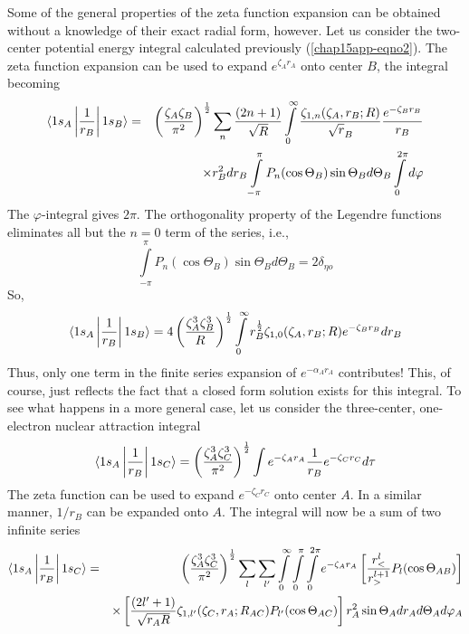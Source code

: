 Some of the general properties of the zeta function expansion can be
obtained without a knowledge of their exact radial form, however. Let
us consider the two-center potential energy integral calculated
previously (\ref{chap15app-eqno2}).  The zeta function expansion can
be used to expand $e^{\zeta_Ar_A}$ onto center $B$, the integral
becoming
\begin{eqnarray}
\langle 1s_A \left| {1 \over r_B} \right| 1s_B \rangle & = & \left( 
{\zeta_A \zeta_B \over \pi^2} \right)^{{1 \over 2}} \sum_{n} {(2n+1) 
\over \sqrt{R}} \int\limits^{\infty}_{0} {\zeta_{1,n}(\zeta_A,r_B;R) 
\over \sqrt{r}_B} {e^{-\zeta_Br_B} \over r_B}\cr
&& \times r^2_B dr_B \int\limits^{\pi}_{- \pi} P_n ( \cos \Theta_B ) 
\sin \Theta_B d \Theta_B \int\limits^{2\pi}_{0} d \varphi
\end{eqnarray}
The $\varphi$-integral gives $2\pi$.  The orthogonality property of 
the Legendre functions eliminates all but the $n = 0$ term of the series, i.e.,
\begin{equation}
\int\limits^{\pi}_{-\pi} P_n ( \cos \Theta_B ) \sin \Theta_B d 
\Theta_B = 2 \delta_{\eta o}
\end{equation}
So,
\begin{equation}
\langle 1s_A \left| {1 \over r_B} \right| 1s_B \rangle = 4 
\left( {\zeta^3_A \zeta^3_B \over R} \right)^{{1 \over 2}} 
\int\limits^{\infty}_{0} r^{{1 \over 2}}_B \zeta_{1,0} (\zeta_A, 
r_B;R) e^{-\zeta_B r_B} dr_B
\end{equation}
Thus, only one term in the finite series expansion of 
$e^{-\alpha_Ar_A}$ contributes!  This, of course, just reflects the 
fact that a closed form solution exists for
this integral.  To see what happens in a more general case, let us consider
the three-center, one-electron nuclear attraction integral
\begin{equation}
\langle 1s_A \left| {1 \over r_B} \right| 1s_C \rangle = 
\left( {\zeta^3_A \zeta^3_C \over \pi^2} \right)^{{1 \over 2}} 
\int e^{- \zeta_Ar_A} {1 \over r_B} e^{- \zeta_Cr_C} d \tau
\end{equation}
The zeta function can be used to expand $e^{-\zeta_Cr_C}$ onto 
center $A$. In a similar manner, $1/r_B$ can be expanded onto $A$. The 
integral will now be a sum of two infinite series
\begin{eqnarray}
\langle 1s_A \left| {1 \over r_B} \right| 1s_C \rangle & = &
\left( {\zeta^3_A \zeta^3_C \over \pi^2} \right)^{{1 \over 2}} 
\sum_{l} \sum_{l^{\prime}} \int\limits^{\infty}_{0} 
\int\limits^{\pi}_{0} \int\limits^{2 \pi}_{0} e^{-\zeta_Ar_A} 
\left[ {r^l_< \over r^{l+1}_>} P_l ( \cos \Theta_{AB}) \right]\cr
&& \times \left[ {(2l^{\prime}+1) \over \sqrt{r_AR}} 
\zeta_{1,l^{\prime}} ( \zeta_C , r_A; R_{AC}) P_{l^{\prime}} ( \cos 
\Theta_{AC})\right] r^2_A \sin \Theta_A dr_A d \Theta_A d \varphi_A
\end{eqnarray}
